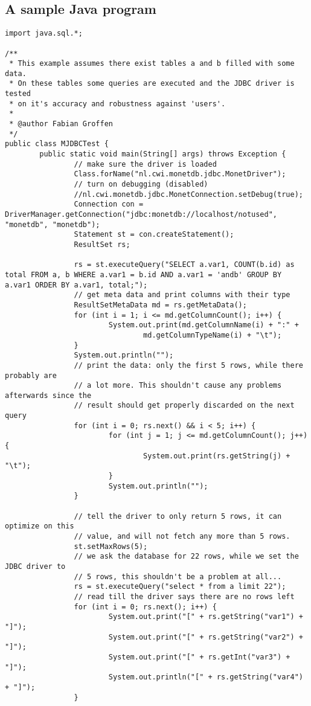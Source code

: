 \documentclass{article}
\begin{document}
\subsection{A sample Java program}
\begin{verbatim}
import java.sql.*;

/**
 * This example assumes there exist tables a and b filled with some data.
 * On these tables some queries are executed and the JDBC driver is tested
 * on it's accuracy and robustness against 'users'.
 *
 * @author Fabian Groffen
 */
public class MJDBCTest {
        public static void main(String[] args) throws Exception {
                // make sure the driver is loaded
                Class.forName("nl.cwi.monetdb.jdbc.MonetDriver");
                // turn on debugging (disabled)
                //nl.cwi.monetdb.jdbc.MonetConnection.setDebug(true);
                Connection con = DriverManager.getConnection("jdbc:monetdb://localhost/notused", "monetdb", "monetdb");
                Statement st = con.createStatement();
                ResultSet rs;

                rs = st.executeQuery("SELECT a.var1, COUNT(b.id) as total FROM a, b WHERE a.var1 = b.id AND a.var1 = 'andb' GROUP BY a.var1 ORDER BY a.var1, total;");
                // get meta data and print columns with their type
                ResultSetMetaData md = rs.getMetaData();
                for (int i = 1; i <= md.getColumnCount(); i++) {
                        System.out.print(md.getColumnName(i) + ":" +
                                md.getColumnTypeName(i) + "\t");
                }
                System.out.println("");
                // print the data: only the first 5 rows, while there probably are
                // a lot more. This shouldn't cause any problems afterwards since the
                // result should get properly discarded on the next query
                for (int i = 0; rs.next() && i < 5; i++) {
                        for (int j = 1; j <= md.getColumnCount(); j++) {
                                System.out.print(rs.getString(j) + "\t");
                        }
                        System.out.println("");
                }
                
                // tell the driver to only return 5 rows, it can optimize on this
                // value, and will not fetch any more than 5 rows.
                st.setMaxRows(5);
                // we ask the database for 22 rows, while we set the JDBC driver to
                // 5 rows, this shouldn't be a problem at all...
                rs = st.executeQuery("select * from a limit 22");
                // read till the driver says there are no rows left
                for (int i = 0; rs.next(); i++) {
                        System.out.print("[" + rs.getString("var1") + "]");
                        System.out.print("[" + rs.getString("var2") + "]");
                        System.out.print("[" + rs.getInt("var3") + "]");
                        System.out.println("[" + rs.getString("var4") + "]");
                }
                

\end{verbatim}
\end{document}
